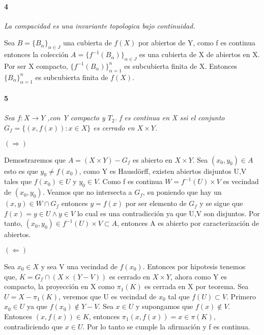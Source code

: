 \documentclass[12pt]{article}
\begin{document}
\paragraph{4}
\textit{La compacidad es una invariante topologica bajo continuidad.}

Sea $B=\{B_\alpha\}_{\alpha\in J}$ una cubierta de $f(X)$ por abiertos de Y, como f es continua entonces la colección $A=\{f^{-1}(B_\alpha)\}_{\alpha\in J}$ es una cubierta de X de abiertos en X. Por ser X compacto, $\{f^{-1}(B_\alpha)\}_{\alpha=1}^n$ es subcubierta finita de X. Entonces $\{B_\alpha\}_{\alpha=1}^n$ es subcubierta finita de $f(X)$.

\paragraph{5}
\textit{Sea $f:X\rightarrow Y$ ,con Y compacto y $T_2$. f es continua en X ssi el conjunto $G_f =\{(x,f(x)):x\in X\}$ es cerrado en $X\times Y$.}

$(\Rightarrow)$

Demostraremos que $A=(X\times Y) - G_f$ es abierto en $X\times Y$. Sea $(x_0 ,y_0)\in A$ esto es que $y_0\neq f(x_0)$, como Y es Hausdörff, existen abiertos disjuntos U,V tales que $f(x_0)\in U$ y $y_0\in V$. Como f es continua $W=f^{-1}(U)\times V$ es vecindad de $(x_0,y_0)$. Veamos que no intersecta a $G_f$, su poniendo que hay un $(x,y)\in W \cap G_f$ entonces $y=f(x)$ por ser elemento de $G_f$ y se sigue que $f(x)=y\in U \land y\in V$ lo cual es una contradicción ya que U,V son disjuntos. Por tanto, $(x_0,y_0)\in f^{-1}(U)\times V\subset A$, entonces A es abierto por caracterización de abiertos.

$(\Leftarrow)$

Sea $x_0\in X$ y sea V una vecindad de $f(x_0)$. Entonces por hipotesis tenemos que, $K=G_f \cap (X\times (Y-V))$ es cerrado en $X\times Y$, ahora como Y es compacto, la proyección en X como $\pi_1(K)$ es cerrada en X por teorema. Sea $U=X-\pi_1(K)$, veremos que U es vecindad de $x_0$ tal que $f(U)\subset V$. Primero $x_0\in U$ ya que $f(x_0)\notin Y-V$. Sea $x\in U$ y supongamos que $f(x)\notin V$. Entonces $(x,f(x))\in K$, entonces $\pi_1(x,f(x))=x\in \pi(K)$, contradiciendo que $x\in U$. Por lo tanto se cumple la afirmación y f es continua.
\end{document}
